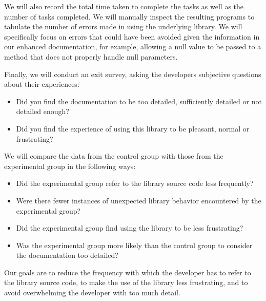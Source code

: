 We will also record the total time taken to complete the tasks as well as the
number of tasks completed. We will manually inspect the resulting programs to
tabulate the number of errors made in using the underlying library. We will
specifically focus on errors that could have been avoided given the information
in our enhanced documentation, for example, allowing a null value to be passed
to a method that does not properly handle null parameters.

Finally, we will conduct an exit survey, asking the developers subjective
questions about their experiences:

\begin{itemize}
\item Did you find the documentation to be too detailed, sufficiently detailed
  or not detailed enough?
\item Did you find the experience of using this library to be pleasant, normal
  or frustrating?
\end{itemize}

We will compare the data from the control group with those from the
experimental group in the following ways:

\begin{itemize}
\item Did the experimental group refer to the library source code less
  frequently?
\item Were there fewer instances of unexpected library behavior encountered by
  the experimental group?
\item Did the experimental group find using the library to be less frustrating?
\item Was the experimental group more likely than the control group to consider
  the documentation too detailed?
\end{itemize}

Our goals are to reduce the frequency with which the developer has to refer to
the library source code, to make the use of the library less frustrating, and
to avoid overwhelming the developer with too much detail.
